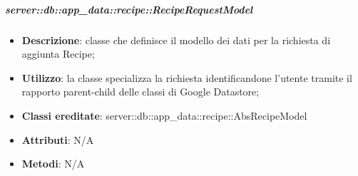 		\subparagraph{server::db::app\_data::recipe::RecipeRequestModel} %
		\label{subp:server_db_app_data_recipe_reciperequestmodel}
			\begin{itemize}
				\item \textbf{Descrizione}: classe che definisce il modello dei dati per la richiesta di aggiunta Recipe;
				\item \textbf{Utilizzo}: la classe specializza la richiesta identificandone l'utente tramite il rapporto parent-child delle classi di Google Datastore;
				\item \textbf{Classi ereditate}: server::db::app\_data::recipe::AbsRecipeModel
				\item \textbf{Attributi}: N/A
				\item \textbf{Metodi}: N/A
			\end{itemize}


